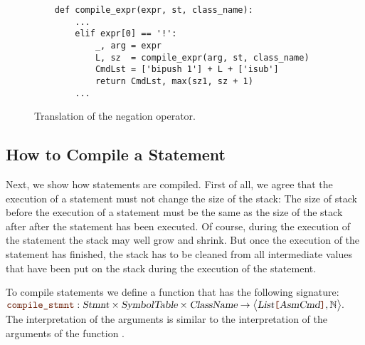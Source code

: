 \begin{figure}[!ht]
\centering
\begin{verbatim}
    def compile_expr(expr, st, class_name):
        ...
        elif expr[0] == '!':
            _, arg = expr
            L, sz  = compile_expr(arg, st, class_name)
            CmdLst = ['bipush 1'] + L + ['isub']
            return CmdLst, max(sz1, sz + 1)
        ...
\end{verbatim}
\vspace*{-0.3cm}
\caption{Translation of the negation operator.}
\label{fig:Compiler.ipynb:compile:not}
\end{figure}


\subsection{How to Compile a Statement}
Next, we show how statements are compiled.  First of all, we agree that the execution of a statement
must not change the size of the stack:  The size of stack before the execution of a statement must
be the same as the size of the stack after after the statement has been executed.
Of course, during the execution of the statement the stack may well
grow and shrink.  But once the execution of the statement has finished, the stack has to be cleaned from all
intermediate values that have been put on the stack during the execution of the statement.

To compile statements we define a function
 that has the following signature:
\\[0.2cm]
\hspace*{1.3cm}
$\mytt{compile\_stmnt}: \textsl{Stmnt} \times \textsl{SymbolTable} \times \textsl{ClassName} \rightarrow 
                 \bigl\langle\textsl{List}\mytt{[}\textsl{AsmCmd}\mytt{]}, \mathbb{N}\bigr\rangle.$
\\[0.2cm]
The interpretation of the arguments is similar to the interpretation of the arguments
of the function .  


